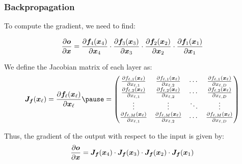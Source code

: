 \documentclass[smaller, handout]{beamer}
\begin{document}
\begin{frame}
  \frametitle{Backpropagation}\pause

  To compute the gradient, we need to find:

  \begin{equation}
    \frac{\partial{\bm o}}{\partial{\bm x}} = \frac{\partial{\bm f_{4}(\bm x_{4})}}{\partial{\bm x_{4}}} \cdot \frac{\partial{\bm f_{3}(\bm x_{3})}}{\partial{\bm x_{3}}} \cdot \frac{\partial{\bm f_{2}(\bm x_{2})}}{\partial{\bm x_{2}}} \cdot \frac{\partial{\bm f_{1}(\bm x_{1})}}{\partial{\bm x_{1}}}
  \end{equation}

  \pause

  We define the Jacobian matrix of each layer as:
  \begin{equation}
    \bm J_{\bm f}(\bm x_{\ell}) = \pd{\bm f_{\ell}(\bm x_{\ell})}{\bm x_{\ell}} \pause
    = 
    \begin{pmatrix}
      \pd{f_{\ell,1}(\bm x_{\ell})}{x_{\ell,1}} & \pd{f_{\ell,1}(\bm x_{\ell})}{x_{\ell,2}} & \cdots & \pd{f_{\ell,1}(\bm x_{\ell})}{x_{\ell,D}} \\
      \pd{f_{\ell,2}(\bm x_{\ell})}{x_{\ell,1}} & \pd{f_{\ell,2}(\bm x_{\ell})}{x_{\ell,2}} & \cdots & \pd{f_{\ell,2}(\bm x_{\ell})}{x_{\ell,D}} \\
      \vdots & \vdots & \ddots & \vdots \\
      \pd{f_{\ell,M}(\bm x_{\ell})}{x_{\ell,1}} & \pd{f_{\ell,M}(\bm x_{\ell})}{x_{\ell,2}} & \cdots & \pd{f_{\ell,M}(\bm x_{\ell})}{x_{\ell,D}}
    \end{pmatrix}
  \end{equation}

  \pause
  Thus, the gradient of the output with respect to the input is given by:\pause
  \begin{equation}
    \frac{\partial{\bm o}}{\partial{\bm x}} = \bm J_{\bm f}(\bm x_{4}) \cdot \bm J_{\bm f}(\bm x_{3}) \cdot \bm J_{\bm f}(\bm x_{2}) \cdot \bm J_{\bm f}(\bm x_{1})
  \end{equation}
\end{frame}
\end{document}
